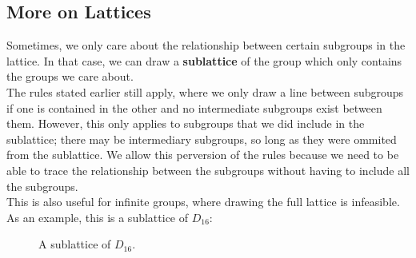 \documentclass[12pt]{article}
\begin{document}
    \subsection*{More on Lattices}
    
    Sometimes, we only care about the relationship
    between certain subgroups in the lattice.
    In that case, we can draw a \textbf{sublattice}
    of the group which only contains the groups we care about. \\
    The rules stated earlier still apply,
    where we only draw a line between subgroups
    if one is contained in the other
    and no intermediate subgroups exist between them.
    However, this only applies to subgroups that we did include
    in the sublattice;
    there may be intermediary subgroups,
    so long as they were ommited from the sublattice.
    We allow this perversion of the rules
    because we need to be able to
    trace the relationship between the subgroups
    without having to include all the subgroups. \\
    This is also useful for infinite groups,
    where drawing the full lattice is infeasible.
    As an example, this is a sublattice of $D_16$:
    \begin{figure}[H]
        \centering
    \caption{\label{fig:figure1} A sublattice of $D_{16}$.}
    \end{figure} 
\end{document}
